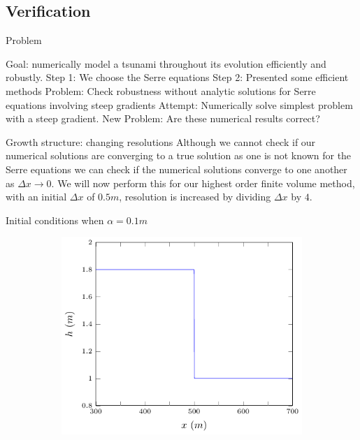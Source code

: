 \documentclass[pdf]{beamer}
\begin{document}
\subsection{Verification}

\begin{frame}{Problem}
	
	Goal: numerically model a tsunami throughout its evolution efficiently and robustly.
	\vskip 0.2cm
	Step 1: We choose the Serre equations 
	\vskip 0.2cm
	Step 2: Presented some efficient methods
	\vskip 0.2cm
	Problem: Check robustness without analytic solutions for Serre equations involving steep gradients
	\vskip 0.2cm
	Attempt: Numerically solve simplest problem with a steep gradient.
	\vskip 0.2cm
	New Problem: Are these numerical results correct?	
\end{frame}

\begin{frame}{Growth structure: changing resolutions}
	Although we cannot check if our numerical solutions are converging to a true solution as one is not known for the Serre equations we can check if the numerical solutions converge to one another as $\Delta x \rightarrow 0$. 
	\vskip 0.2cm
	We will now perform this for our highest order finite volume method, with an initial $\Delta x$ of $0.5m$, resolution is increased by dividing $\Delta x$ by $4$.
\end{frame}

\begin{frame}{Initial conditions when $\alpha = 0.1m$}
	\begin{figure}
		\centering
		\begin{subfigure}{0.75\textwidth}
			\includegraphics[width=\textwidth]{../Pics/init/DBs12/1-figure0.pdf}
		\end{subfigure}%
	\end{figure}
\end{frame}
\end{document}
